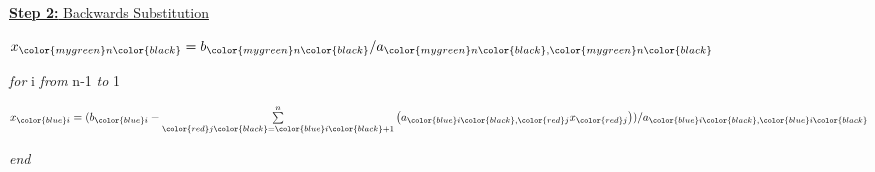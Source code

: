 \documentclass[fleqn]{beamer} %
\begin{document}
\begin{frame}
\begin{multicols}{2}
		\underline{{\bf Step 2:} Backwards Substitution} \vspace{2mm}
		
				$x_{\color{mygreen}n\color{black}}=b_{\color{mygreen}n\color{black}}/a_{\color{mygreen}n\color{black},\color{mygreen}n\color{black}}$ \vspace{2mm}
				
		{\it for} \color{blue}i \color{black} {\it from} \color{mygreen}n\color{black}-1 {\it to} 1 \vspace{4mm}
	
		\hspace*{10mm}$x_{\color{blue}i}=(b_{\color{blue}i}-\sum\limits^n_{\color{red}j\color{black}=\color{blue}i\color{black}+1}\left( a_{\color{blue}i\color{black},\color{red}j}x_{\color{red}j}\right)) /a_{\color{blue}i\color{black},\color{blue}i\color{black}}$	\vspace{2mm}
		
		{\it end} \vspace{2mm}
		
				\end{multicols}

				
				\btVFill
			\end{frame}	
\end{document}
